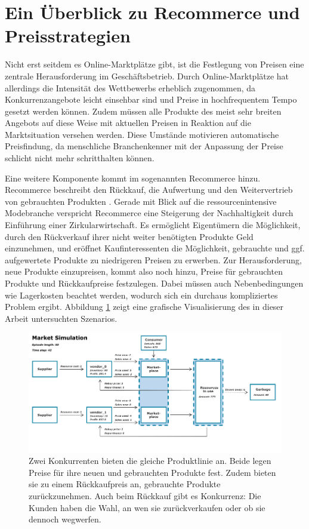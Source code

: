\section{Ein Überblick zu Recommerce und Preisstrategien}
Nicht erst seitdem es Online-Marktplätze gibt, ist die Festlegung von Preisen eine zentrale Herausforderung im Geschäftsbetrieb.
Durch Online-Marktplätze hat allerdings die Intensität des Wettbewerbs erheblich zugenommen, da Konkurrenzangebote leicht einsehbar sind und Preise in hochfrequentem Tempo gesetzt werden können.
Zudem müssen alle Produkte des meist sehr breiten Angebots auf diese Weise mit aktuellen Preisen in Reaktion auf die Marktsituation versehen werden.
Diese Umstände motivieren automatische Preisfindung, da menschliche Branchenkenner mit der Anpassung der Preise schlicht nicht mehr schritthalten können.

Eine weitere Komponente kommt im sogenannten Recommerce hinzu.
Recommerce beschreibt den Rückkauf, die Aufwertung und den Weitervertrieb von gebrauchten Produkten \cite{deges2019grundlagen}.
Gerade mit Blick auf die ressourcenintensive Modebranche verspricht Recommerce eine Steigerung der Nachhaltigkeit durch Einführung einer Zirkularwirtschaft.
Es ermöglicht Eigentümern die Möglichkeit, durch den Rückverkauf ihrer nicht weiter benötigten Produkte Geld einzunehmen, und eröffnet Kaufinteressenten die Möglichkeit, gebrauchte und ggf. aufgewertete Produkte zu niedrigeren Preisen zu erwerben.
Zur Herausforderung, neue Produkte einzupreisen, kommt also noch hinzu, Preise für gebrauchten Produkte und Rückkaufpreise festzulegen.
Dabei müssen auch Nebenbedingungen wie Lagerkosten beachtet werden, wodurch sich ein durchaus kompliziertes Problem ergibt.
Abbildung \ref{grafic:MarketOverview} zeigt eine grafische Visualisierung des in dieser Arbeit untersuchten Szenarios.

\begin{figure}[htbp]
	\label{grafic:MarketOverview}
	\centering
	\includegraphics{MarketOverview_042.png}
	\caption{
		Zwei Konkurrenten bieten die gleiche Produktlinie an.
		Beide legen Preise für ihre neuen und gebrauchten Produkte fest.
		Zudem bieten sie zu einem Rückkaufpreis an, gebrauchte Produkte zurückzunehmen.
		Auch beim Rückkauf gibt es Konkurrenz: Die Kunden haben die Wahl, an wen sie zurückverkaufen oder ob sie dennoch wegwerfen.
	}
\end{figure}

